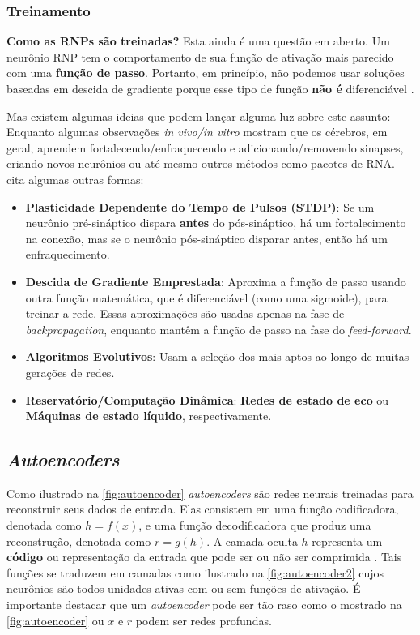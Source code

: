 		\subsubsection{Treinamento}
		
			\par \textbf{Como as RNPs são treinadas?} Esta ainda é uma questão em aberto. Um neurônio RNP tem o comportamento de sua função de ativação mais parecido com uma \textbf{função de passo}. Portanto, em princípio, não podemos usar soluções baseadas em descida de gradiente porque esse tipo de função \textbf{não é} diferenciável \cite{kasabov2019time}.
			
			\par Mas existem algumas ideias que podem lançar alguma luz sobre este assunto: Enquanto algumas observações \textit{in vivo/in vitro} mostram que os cérebros, em geral, aprendem fortalecendo/enfraquecendo e adicionando/removendo sinapses, criando novos neurônios ou até mesmo outros métodos como pacotes de RNA. \cite{kasabov2019time} cita algumas outras formas:
			
			\begin{itemize}
				\item \textbf{Plasticidade Dependente do Tempo de Pulsos (STDP)}: Se um neurônio pré-sináptico dispara \textbf{antes} do pós-sináptico, há um fortalecimento na conexão, mas se o neurônio pós-sináptico disparar antes, então há um enfraquecimento.
				\item \textbf{Descida de Gradiente Emprestada}: Aproxima a função de passo usando outra função matemática, que é diferenciável (como uma sigmoide), para treinar a rede. Essas aproximações são usadas apenas na fase de \textit{backpropagation}, enquanto mantêm a função de passo na fase do \textit{feed-forward}.
				\item \textbf{Algoritmos Evolutivos}: Usam a seleção dos mais aptos ao longo de muitas gerações de redes.
				\item \textbf{Reservatório/Computação Dinâmica}: \textbf{Redes de estado de eco} ou \textbf{Máquinas de estado líquido}, respectivamente.
			\end{itemize}
		
		\subsection{\textit{Autoencoders}}
		
			\par Como ilustrado na  \autoref{fig:autoencoder} \textit{autoencoders} são redes neurais treinadas para reconstruir seus dados de entrada. Elas consistem em uma função codificadora, denotada como $h = f(x)$, e uma função decodificadora que produz uma reconstrução, denotada como $r = g(h)$. A camada oculta $h$ representa um \textbf{código} ou representação da entrada que pode ser ou não ser comprimida \cite{Goodfellow-et-al-2016}. Tais funções se traduzem em camadas como ilustrado na  \autoref{fig:autoencoder2} cujos neurônios são todos unidades ativas com ou sem funções de ativação. É importante destacar que um \textit{autoencoder} pode ser tão raso como o mostrado na \autoref{fig:autoencoder} ou $x$ e $r$ podem ser redes profundas.
			
